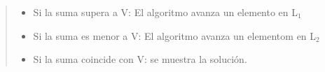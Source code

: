 \documentclass[7pt,a4paper]{article}
\begin{document}
\begin{verse}
	\begin{itemize}
	\item Si la suma supera a V: El algoritmo avanza un elemento en L$_{1}$
	\item Si la suma es menor a V: El algoritmo avanza un elementom en L$_{2}$
	\item Si la suma coincide con V: se muestra la solución.
	\end{itemize}
	
	

\end{verse}
\end{document}
